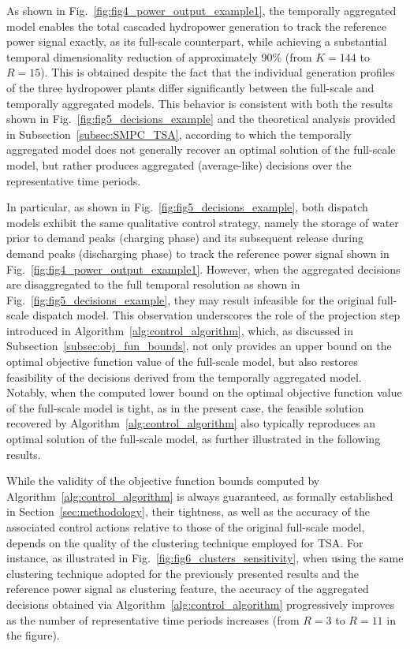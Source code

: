 \documentclass[a4paper,fleqn]{cas-sc}
\begin{document}
As shown in Fig.~\ref{fig:fig4_power_output_example1}, the temporally aggregated model enables the total cascaded hydropower generation to track the reference power signal exactly, as its full-scale counterpart,
while achieving a substantial temporal dimensionality reduction of approximately 90\% (from $K=144$ to $R=15$).
This is obtained despite the fact that the individual generation profiles of the three hydropower plants differ significantly between the full-scale and temporally aggregated models.
This behavior is consistent with both the results shown in Fig.~\ref{fig:fig5_decisions_example} and the theoretical analysis provided in Subsection~\ref{subsec:SMPC_TSA},
according to which the temporally aggregated model does not generally recover an optimal solution of the full-scale model,
but rather produces aggregated (average-like) decisions over the representative time periods.

In particular, as shown in Fig.~\ref{fig:fig5_decisions_example}, both dispatch models exhibit the same qualitative control strategy,
namely the storage of water prior to demand peaks (charging phase) and its subsequent release during demand peaks (discharging phase) to track the reference power signal shown in Fig.~\ref{fig:fig4_power_output_example1}.
However, when the aggregated decisions are disaggregated to the full temporal resolution as shown in Fig.~\ref{fig:fig5_decisions_example}, they may result infeasible for the original full-scale dispatch model.
This observation underscores the role of the projection step introduced in Algorithm~\ref{alg:control_algorithm}, which, as discussed in Subsection~\ref{subsec:obj_fun_bounds},
not only provides an upper bound on the optimal objective function value of the full-scale model,
but also restores feasibility of the decisions derived from the temporally aggregated model.
Notably, when the computed lower bound on the optimal objective function value of the full-scale model is tight, as in the present case,
the feasible solution recovered by Algorithm~\ref{alg:control_algorithm} also typically reproduces an optimal solution of the full-scale model, as further illustrated in the following results.

While the validity of the objective function bounds computed by Algorithm~\ref{alg:control_algorithm} is always guaranteed,
as formally established in Section~\ref{sec:methodology}, 
their tightness, as well as the accuracy of the associated control actions relative to those of the original full-scale model,
depends on the quality of the clustering technique employed for TSA.
For instance, as illustrated in Fig.~\ref{fig:fig6_clusters_sensitivity}, when using the same clustering technique adopted for the previously presented results and the reference power signal as clustering feature, 
the accuracy of the aggregated decisions obtained via Algorithm~\ref{alg:control_algorithm} progressively improves as the number of representative time periods increases (from $R=3$ to $R=11$ in the figure).
\end{document}
